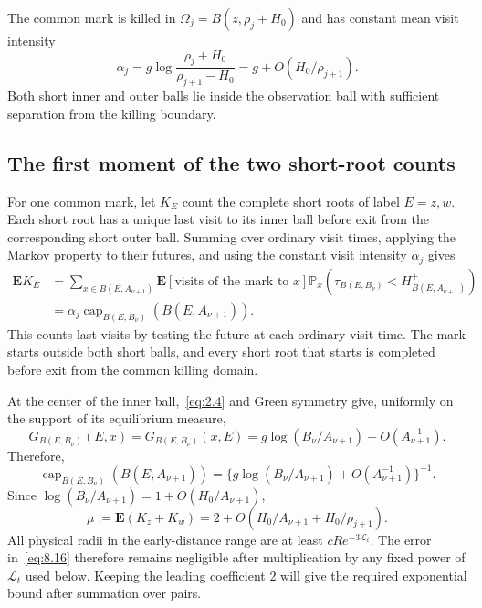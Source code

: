 \documentclass[11pt,letterpaper,reqno]{amsart}
\numberwithin{equation}{section}
\theoremstyle{remark}
\begin{document}
The common mark is killed in $\Omega_j=B(z,\rho_j+H_0)$ and has constant mean visit intensity
\begin{equation}\label{eq:8.13}
\alpha_j=g\log\frac{\rho_j+H_0}{\rho_{j+1}-H_0}=g+O(H_0/\rho_{j+1}).
\end{equation}
Both short inner and outer balls lie inside the observation ball with sufficient separation from the killing boundary.

\subsection{The first moment of the two short-root counts}\label{sec:rootmean}
For one common mark, let $K_E$ count the complete short roots of label $E=z,w$. Each short root has a unique last visit to its inner ball before exit from the corresponding short outer ball. Summing over ordinary visit times, applying the Markov property to their futures, and using the constant visit intensity $\alpha_j$ gives
\begin{equation}\label{eq:8.14}
\begin{split}
\mathbf EK_E
&=\sum_{x\in B(E,A_{\nu+1})}\mathbf E[\text{visits of the mark to }x\text{}]
\mathbb P_x(\tau_{B(E,B_{\nu})}<H_{B(E,A_{\nu+1})}^+)\\
&=\alpha_j\operatorname{cap}_{B(E,B_{\nu})}(B(E,A_{\nu+1})).
\end{split}
\end{equation}
This counts last visits by testing the future at each ordinary visit time. The mark starts outside both short balls, and every short root that starts is completed before exit from the common killing domain.

At the center of the inner ball,~\eqref{eq:2.4} and Green symmetry give, uniformly on the support of its equilibrium measure,
\[
G_{B(E,B_\nu)}(E,x)
=G_{B(E,B_\nu)}(x,E)
=g\log(B_\nu/A_{\nu+1})+O(A_{\nu+1}^{-1}).
\]
Therefore,
\begin{equation}\label{eq:8.15}
\operatorname{cap}_{B(E,B_{\nu})}(B(E,A_{\nu+1}))
=\{g\log(B_{\nu}/A_{\nu+1})+O(A_{\nu+1}^{-1})\}^{-1}.
\end{equation}
Since $\log(B_\nu/A_{\nu+1})=1+O(H_0/A_{\nu+1})$,
\begin{equation}\label{eq:8.16}
\mu:=\mathbf E(K_z+K_w)
=2+O(H_0/A_{\nu+1}+H_0/\rho_{j+1}).
\end{equation}
All physical radii in the early-distance range are at least $cRe^{-3\mathcal L_t}$. The error in~\eqref{eq:8.16} therefore remains negligible after multiplication by any fixed power of $\mathcal L_t$ used below. Keeping the leading coefficient $2$ will give the required exponential bound after summation over pairs.
\end{document}
